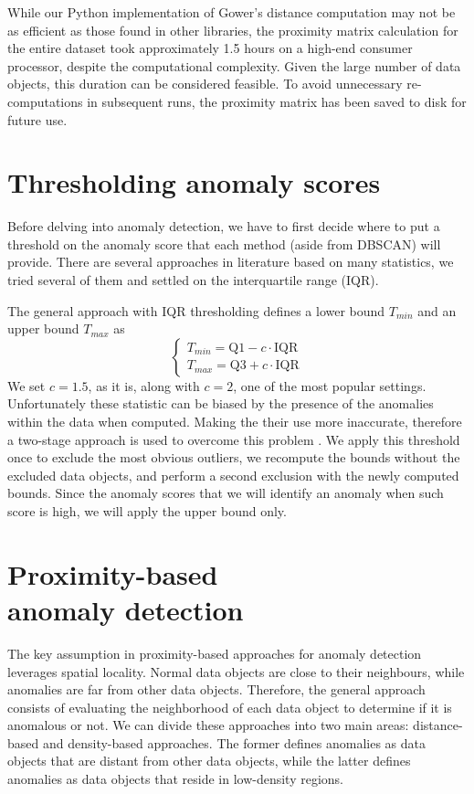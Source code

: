 \documentclass[9pt,twocolumn]{article}
\begin{document}
While our Python implementation of Gower's distance computation may not be as efficient as those found in other libraries, the proximity matrix calculation for the entire dataset took approximately 1.5 hours on a high-end consumer processor, despite the computational complexity. Given the large number of data objects, this duration can be considered feasible. To avoid unnecessary re-computations in subsequent runs, the proximity matrix has been saved to disk for future use.

\section{Thresholding anomaly scores}
Before delving into anomaly detection, we have to first decide where to put a threshold on the anomaly score that each method (aside from DBSCAN) will provide. There are several approaches in literature based on many statistics, we tried several of them and settled on the interquartile range (IQR).

The general approach with IQR thresholding defines a lower bound $T_{min}$ and an upper bound $T_{max}$ as
\begin{equation}
\begin{cases}
T_{min} = \mathrm{Q1} - c \cdot \mathrm{IQR} \\
T_{max} = \mathrm{Q3} + c \cdot \mathrm{IQR}
\end{cases}
\end{equation}
We set $c=1.5$, as it is, along with $c=2$, one of the most popular settings.
Unfortunately these statistic can be biased by the presence of the anomalies within the data when computed. Making the their use more inaccurate, therefore a two-stage approach is used to overcome this problem \cite{Yang2019OutlierDH}. We apply this threshold once to exclude the most obvious outliers, we recompute the bounds without the excluded data objects, and perform a second exclusion with the newly computed bounds. Since the anomaly scores that we will identify an anomaly when such score is high, we will apply the upper bound only.

\section{Proximity-based\\ anomaly detection}
The key assumption in proximity-based approaches for anomaly detection leverages spatial locality. Normal data objects are close to their neighbours, while anomalies are far from other data objects. Therefore, the general approach consists of evaluating the neighborhood of each data object to determine if it is anomalous or not. We can divide these approaches into two main areas: distance-based and density-based approaches. The former defines anomalies as data objects that are distant from other data objects, while the latter defines anomalies as data objects that reside in low-density regions.
\end{document}
